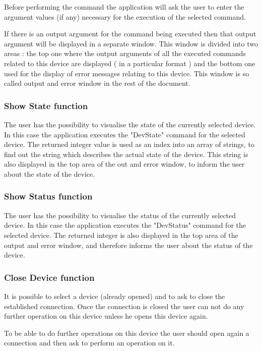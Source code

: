 Before performing the command the application will ask the user to enter the
argument values (if any) necessary for the execution of the selected command.

If there is an output argument for the command being executed then that output
argument will be displayed in a separate window. This window is divided into
two areas : the top one where the output arguments of all the executed 
commands related to this device are displayed ( in a particular format ) and the
bottom one used for the display of error messages relating to this device. 
This window is so called output and error window in the rest of the document. 

\subsubsection{Show State function}

The user has the possibility to visualise the state of the currently selected
device. In this case the application executes the "DevState" command for the
selected device. The returned integer value is used as an index into an array of
strings, to find out the string which describes the actual state of the device.
This string is also displayed in the top area of the out and error window, to
inform the user about the state of the device.

\subsubsection{Show Status function}

The user has the possibility to visualise the status of the currently selected
device. In this case the application executes the "DevStatus" command for the
selected device. The returned integer is also displayed in the top area of the  
output and error window, and therefore informs the user about the status of the 
device.

\subsubsection{Close Device function}

It is possible to select a device (already opened) and to ask to close the
established connection. Once the connection is closed the user can not
do any further operation on this device unless he opens this device again.

To be able to do further operations on this device the user should open again
a connection and then ask to perform an operation on it.

